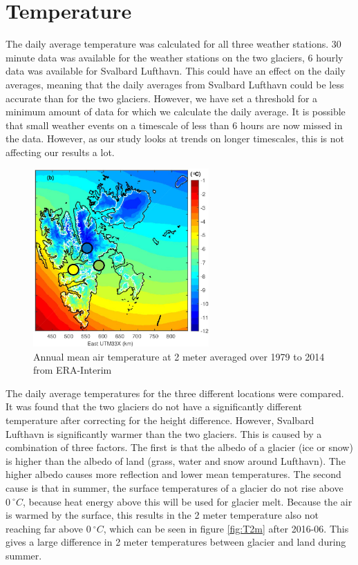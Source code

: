 \documentclass[11pt]{report}
\begin{document}
\section{Temperature} \label{sec:Tdisc}

The daily average temperature was calculated for all three weather stations. 30 minute data was available for the weather stations on the two glaciers, 6 hourly data was available for Svalbard Lufthavn. This could have an effect on the daily averages, meaning that the daily averages from Svalbard Lufthavn could be less accurate than for the two glaciers. However, we have set a threshold for a minimum amount of data for which we calculate the daily average. It is possible that small weather events on a timescale of less than 6 hours are now missed in the data. However, as our study looks at trends on longer timescales, this is not affecting our results a lot.

\begin{figure}
\includegraphics[width=0.6\textwidth]{ostby.jpg}
\caption{Annual mean air temperature at 2 meter averaged over 1979 to 2014 from ERA-Interim \cite{osby}}
\label{fig:trossby}
\end{figure}
The daily average temperatures for the three different locations were compared. It was found that the two glaciers do not have a significantly different temperature after correcting for the height difference. However, Svalbard Lufthavn is significantly warmer than the two glaciers. This is caused by a combination of three factors. The first is that the albedo of a glacier (ice or snow) is higher than the albedo of land (grass, water and snow around Lufthavn). The higher albedo causes more reflection and lower mean temperatures. The second cause is that in summer, the surface temperatures of a glacier do not rise above $\SI{0}{^\circ C}$, because heat energy above this will be used for glacier melt. Because the air is warmed by the surface, this results in the 2 meter temperature also not reaching far above $\SI{0}{^\circ C}$, which can be seen in figure \ref{fig:T2m} after 2016-06. This gives a large difference in 2 meter temperatures between glacier and land during summer. 
\end{document}
